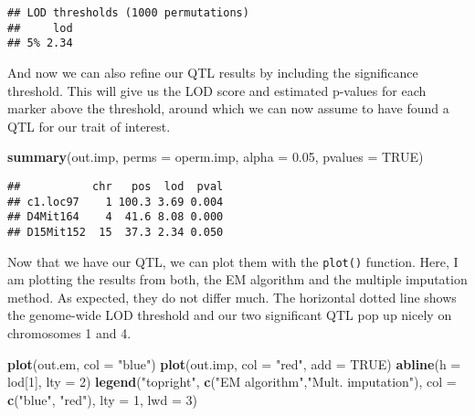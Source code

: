 \documentclass[12pt,]{krantz}
\newenvironment{Shaded}{\begin{snugshade}}{\end{snugshade}}
\newcommand{\KeywordTok}[1]{\textcolor[rgb]{0.27,0.27,0.27}{\textbf{#1}}}
\newcommand{\DataTypeTok}[1]{\textcolor[rgb]{0.27,0.27,0.27}{#1}}
\newcommand{\DecValTok}[1]{\textcolor[rgb]{0.06,0.06,0.06}{#1}}
\newcommand{\FloatTok}[1]{\textcolor[rgb]{0.06,0.06,0.06}{#1}}
\newcommand{\StringTok}[1]{\textcolor[rgb]{0.5,0.5,0.5}{#1}}
\newcommand{\OtherTok}[1]{\textcolor[rgb]{0.56,0.35,0.01}{#1}}
\newcommand{\NormalTok}[1]{#1}
\theoremstyle{definition}
\theoremstyle{definition}
\theoremstyle{definition}
\theoremstyle{remark}
\begin{document}
\begin{verbatim}
## LOD thresholds (1000 permutations)
##     lod
## 5% 2.34
\end{verbatim}

And now we can also refine our QTL results by including the significance
threshold. This will give us the LOD score and estimated p-values for
each marker above the threshold, around which we can now assume to have
found a QTL for our trait of interest.

\begin{Shaded}
\begin{Highlighting}[]
\KeywordTok{summary}\NormalTok{(out.imp, }\DataTypeTok{perms =}\NormalTok{ operm.imp, }\DataTypeTok{alpha =} \FloatTok{0.05}\NormalTok{, }\DataTypeTok{pvalues =} \OtherTok{TRUE}\NormalTok{)}
\end{Highlighting}
\end{Shaded}

\begin{verbatim}
##           chr   pos  lod  pval
## c1.loc97    1 100.3 3.69 0.004
## D4Mit164    4  41.6 8.08 0.000
## D15Mit152  15  37.3 2.34 0.050
\end{verbatim}

Now that we have our QTL, we can plot them with the \texttt{plot()}
function. Here, I am plotting the results from both, the EM algorithm
and the multiple imputation method. As expected, they do not differ
much. The horizontal dotted line shows the genome-wide LOD threshold and
our two significant QTL pop up nicely on chromosomes 1 and 4.

\begin{Shaded}
\begin{Highlighting}[]
\KeywordTok{plot}\NormalTok{(out.em, }\DataTypeTok{col =} \StringTok{"blue"}\NormalTok{)}
\KeywordTok{plot}\NormalTok{(out.imp, }\DataTypeTok{col =} \StringTok{"red"}\NormalTok{, }\DataTypeTok{add =} \OtherTok{TRUE}\NormalTok{)}
\KeywordTok{abline}\NormalTok{(}\DataTypeTok{h =}\NormalTok{ lod[}\DecValTok{1}\NormalTok{], }\DataTypeTok{lty =} \DecValTok{2}\NormalTok{)}
\KeywordTok{legend}\NormalTok{(}\StringTok{"topright"}\NormalTok{, }\KeywordTok{c}\NormalTok{(}\StringTok{"EM algorithm"}\NormalTok{,}\StringTok{"Mult. imputation"}\NormalTok{), }
       \DataTypeTok{col =} \KeywordTok{c}\NormalTok{(}\StringTok{"blue"}\NormalTok{, }\StringTok{"red"}\NormalTok{), }\DataTypeTok{lty =} \DecValTok{1}\NormalTok{, }\DataTypeTok{lwd =} \DecValTok{3}\NormalTok{)}
\end{Highlighting}
\end{Shaded}
\end{document}
